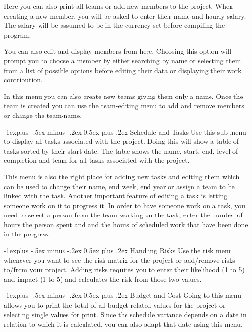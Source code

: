 \documentclass[10pt,landscape]{article}
\makeatletter
\renewcommand{\subsection}{\@startsection{subsection}{2}{0mm}%
                                {-1explus -.5ex minus -.2ex}%
                                {0.5ex plus .2ex}%
                                {\normalfont\normalsize\bfseries}}
\makeatother
\begin{document}
\begin{multicols}{3}
Here you can also print all teams or add new members to the project. When creating a new member, you will be asked to enter their name and hourly salary. The salary will be assumed to be in the currency set before compiling the program. 

You can also edit and display members from here. Choosing this option will prompt you to choose a member by either searching by name or selecting them from a list of possible options before editing their data or displaying their work contribution.

In this menu you can also create new teams giving them only a name. Once the team is created you can use the team-editing menu to add and remove members or change the team-name.

\subsection{Schedule and Tasks}
Use this sub menu to display all tasks associated with the project. Doing this will show a table of tasks sorted by their start-date. The table shows the name, start, end, level of completion and team for all tasks associated with the project. 

This menu is also the right place for adding new tasks and editing them which can be used to change their name, end week, end year or assign a team to be linked with the task. Another important feature of editing a task is letting someone work on it to progress it. In order to have someone work on a task, you need to select a person from the team working on the task, enter the number of hours the person spent and and the hours of scheduled work that have been done in the progress.

\subsection{Handling Risks}
Use the risk menu whenever you want to see the risk matrix for the project or add/remove risks to/from your project. Adding risks requires you to enter their likelihood (1 to 5) and impact (1 to 5) and calculates the risk from those two values.

\subsection{Budget and Cost}
Going to this menu allows you to print the total of all budget-related values for the project or selecting single values for print. Since the schedule variance depends on a date in relation to which it is calculated, you can also adapt that date using this menu.


\end{multicols}
\end{document}
